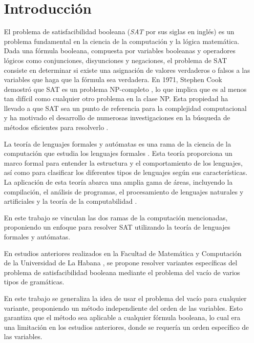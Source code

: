 \chapter*{Introducción}

El problema de satisfacibilidad booleana (\textit{SAT} por sus siglas en inglés) es un problema fundamental en la ciencia de la computación y la lógica matemática. Dada una fórmula booleana, compuesta por variables booleanas y operadores lógicos como conjunciones, disyunciones y negaciones, el problema de SAT consiste en determinar si existe una asignación de valores verdaderos o falsos a las variables que haga que la fórmula sea verdadera. En 1971, Stephen Cook demostró que SAT es un problema NP-completo \cite{automataTheory}, lo que implica que es al menos tan difícil como cualquier otro problema en la clase NP. Esta propiedad ha llevado a que SAT sea un punto de referencia para la complejidad computacional y ha motivado el desarrollo de numerosas investigaciones en la búsqueda de métodos eficientes para resolverlo \cite{biere2021handbook}.

La teoría de lenguajes formales y autómatas es una rama de la ciencia de la computación que estudia los lenguajes formales \cite{automataTheory}. Esta teoría proporciona un marco formal para entender la estructura y el comportamiento de los lenguajes, así como para clasificar los diferentes tipos de lenguajes según sus características. La aplicación de esta teoría abarca una amplia gama de áreas, incluyendo la compilación, el análisis de programas, el procesamiento de lenguajes naturales y artificiales y la teoría de la computabilidad \cite{automataTheory}.

En este trabajo se vinculan las dos ramas de la computación mencionadas, proponiendo un enfoque para resolver SAT utilizando la teoría de lenguajes formales y autómatas.

En estudios anteriores realizados en la Facultad de Matemática y Computación de la Universidad de La Habana \cite{aCFSAT,aSRCSAT, MSAT}, se propone resolver variantes específicas del problema de satisfacibilidad booleana mediante el problema del vacío de varios tipos de gramáticas.

En este trabajo se generaliza la idea de usar el problema del vacío para cualquier variante, proponiendo un método independiente del orden de las variables. Esto garantiza que el método sea aplicable a cualquier fórmula booleana, lo cual era una limitación en los estudios anteriores, donde se requería un orden específico de las variables.

